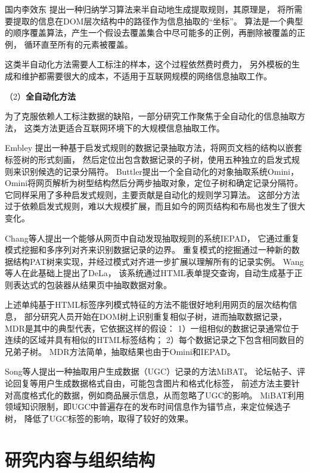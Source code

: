 国内李效东
提出一种归纳学习算法来半自动地生成提取规则，其原理是，
将所需要提取的信息在DOM层次结构中的路径作为信息抽取的“坐标”。
算法是一个典型的顺序覆盖算法，产生一个假设去覆盖集合中尽可能多的正例，再删除被覆盖的正例，
循环直至所有的元素被覆盖。

这类半自动化方法需要人工标注的样本，这个过程依然费时费力，
另外模板的生成和维护都需要很大的成本，不适用于互联网规模的网络信息抽取工作。

（2）\textbf{全自动化方法}

为了克服依赖人工标注数据的缺陷，一部分研究工作聚焦于全自动化的信息抽取方法，
这类方法更适合互联网环境下的大规模信息抽取工作。

Embley
提出一种基于启发式规则的数据记录抽取方法，将网页文档的结构以嵌套标签树的形式刻画，
然后定位出包含数据记录的子树，使用五种独立的启发式规则来识别候选的记录分隔符。
Buttler提出一个全自动化的对象抽取系统Omini，
Omini将网页解析为树型结构然后分两步抽取对象，定位子树和确定记录分隔符。
它同样采用了多种启发式规则，主要贡献是自动化的规则学习算法。
这部分方法过于依赖启发式规则，难以大规模扩展，而且如今的网页结构和布局也发生了很大变化。

Chang等人提出一个能够从网页中自动发现抽取规则的系统IEPAD，
它通过重复模式挖掘和多序列对齐来识别数据记录的边界。
重复模式的挖掘通过一种新的数据结构PAT树来实现，并经过模式对齐进一步扩展以理解所有的记录实例。
Wang等人在此基础上提出了DeLa，
该系统通过HTML表单提交查询，自动生成基于正则表达式的包装器从结果页中抽取数据对象。

上述单纯基于HTML标签序列模式特征的方法不能很好地利用网页的层次结构信息，
部分研究人员开始在DOM树上识别重复相似子树，进而抽取数据记录，
MDR是其中的典型代表，它依据这样的假设：
1）一组相似的数据记录通常位于连续的区域并具有相似的HTML标签结构；
2）每个数据记录之下包含相同数目的兄弟子树。
MDR方法简单，抽取结果也由于Omini和IEPAD。

Song等人提出一种抽取用户生成数据（UGC）记录的方法MiBAT。
论坛帖子、评论回复等用户生成数据格式自由，可能包含图片和格式化标签，
前述方法主要针对高度格式化的数据，例如商品展示信息，从而忽略了UGC的影响。
MiBAT利用领域知识限制，即UGC中普遍存在的发布时间信息作为锚节点，来定位候选子树，
降低了UGC标签的影响，取得了较好的效果。

\section{研究内容与组织结构}

